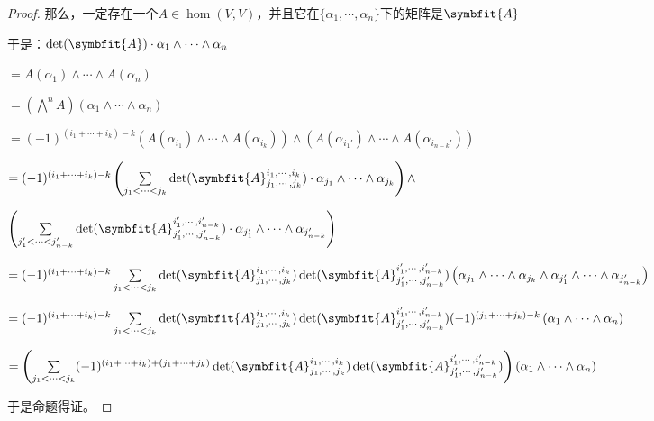 \documentclass[12pt, a4paper, oneside, UTF8]{ctexbook}
\begin{document}
\begin{para}{0}
\begin{proof}
						那么，一定存在一个$A \in \hom(V,V)$，并且它在$\{\alpha_1,\cdots,\alpha_n\}$下的矩阵是$\symbfit{A}$
						
						于是：$\det(\symbfit{A})\cdot \alpha_1\wedge \cdots \wedge \alpha_n$

						$=A(\alpha_1)\wedge \cdots \wedge A(\alpha_n)$

						$=\left(\bigwedge^n A\right)(\alpha_1 \wedge \cdots \wedge \alpha_n)$

						$=(-1)^{(i_1+\cdots+i_k)-k}\left(A(\alpha_{i_1})\wedge \cdots \wedge A(\alpha_{i_k})\right)\wedge\left(A(\alpha_{i_1'})\wedge \cdots \wedge A(\alpha_{i_{n-k}'})\right)$

						$=(-1)^{(i_1+\cdots+i_k)-k}\left(\sum\limits_{j_1 < \cdots < j_k}\det(\symbfit{A}_{j_1,\cdots,j_k}^{i_1,\cdots,i_k})\cdot \alpha_{j_1} \wedge \cdots \wedge \alpha_{j_k}\right) \wedge $
						
						$\left(\sum\limits_{j_{1}' < \cdots < j_{n-k}'}\det(\symbfit{A}_{j_1',\cdots,j_{n-k}'}^{i_1',\cdots,i_{n-k}'})\cdot \alpha_{j_1'} \wedge \cdots \wedge \alpha_{j_{n-k}'}\right)$
					
						$=(-1)^{(i_1+\cdots+i_k)-k}\sum\limits_{j_1 < \cdots < j_k}\det(\symbfit{A}_{j_1,\cdots,j_k}^{i_1,\cdots,i_k})\det(\symbfit{A}_{j_1',\cdots,j_{n-k}'}^{i_1',\cdots,i_{n-k}'})\left(\alpha_{j_1} \wedge \cdots \wedge \alpha_{j_k}\wedge \alpha_{j_1'} \wedge \cdots \wedge \alpha_{j_{n-k}'}\right)$

						$=(-1)^{(i_1+\cdots+i_k)-k}\sum\limits_{j_1 < \cdots < j_k}\det(\symbfit{A}_{j_1,\cdots,j_k}^{i_1,\cdots,i_k})\det(\symbfit{A}_{j_1',\cdots,j_{n-k}'}^{i_1',\cdots,i_{n-k}'})(-1)^{(j_1+\cdots+j_k)-k}\left(\alpha_{1} \wedge \cdots \wedge \alpha_{n}\right)$

						$=\left(\sum\limits_{j_1 < \cdots < j_k} (-1)^{(i_1+\cdots+i_k)+(j_1+\cdots+j_k)}\det(\symbfit{A}_{j_1,\cdots,j_k}^{i_1,\cdots,i_k})\det(\symbfit{A}_{j_1',\cdots,j_{n-k}'}^{i_1',\cdots,i_{n-k}'})\right)(\alpha_1 \wedge \cdots \wedge \alpha_n)$

						于是命题得证。
					\end{proof}
			\end{para}
\ifx\allfiles\undefined
\end{document}

